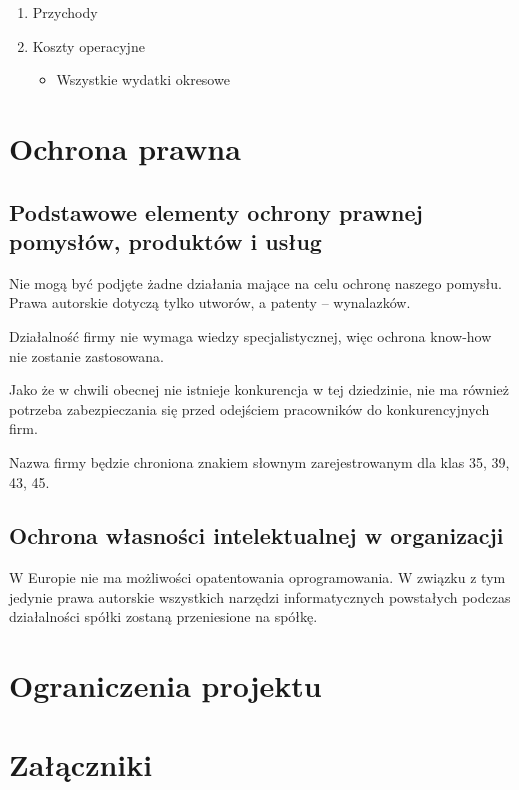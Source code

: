 \documentclass{article}
\begin{document}
\begin{enumerate}
\item Przychody

\item Koszty operacyjne
\begin{itemize}
\item Wszystkie wydatki okresowe 
\end{itemize}

\end{enumerate}

\section{Ochrona prawna}
\subsection{Podstawowe elementy ochrony prawnej pomysłów, produktów i usług}
Nie mogą być podjęte żadne działania mające na celu ochronę naszego pomysłu. Prawa autorskie dotyczą tylko utworów, a patenty -- wynalazków. 

Działalność firmy nie wymaga wiedzy specjalistycznej, więc ochrona know-how nie zostanie zastosowana.

Jako że w chwili obecnej nie istnieje konkurencja w tej dziedzinie, nie ma również potrzeba zabezpieczania się przed odejściem pracowników do konkurencyjnych firm.

Nazwa firmy będzie chroniona znakiem słownym zarejestrowanym dla klas 35, 39, 43, 45.
\subsection{Ochrona własności intelektualnej w organizacji}
W Europie nie ma możliwości opatentowania oprogramowania. W związku z tym jedynie prawa autorskie wszystkich narzędzi informatycznych powstałych podczas działalności spółki zostaną przeniesione na spółkę.

\section{Ograniczenia projektu}





\section{Załączniki}
\end{document}
